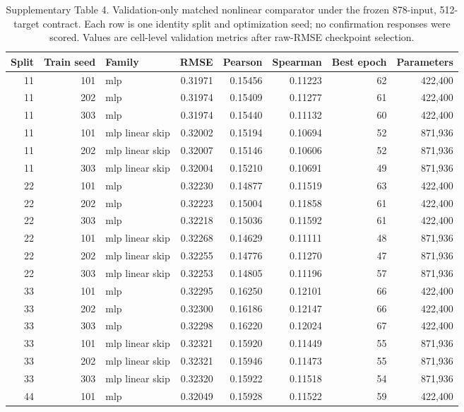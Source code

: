 \begin{table}[ht]\centering\scriptsize\caption{Supplementary Table 4. Validation-only matched nonlinear comparator under the frozen 878-input, 512-target contract. Each row is one identity split and optimization seed; no confirmation responses were scored. Values are cell-level validation metrics after raw-RMSE checkpoint selection.}\label{tab:matched_nonlinear}\begin{tabular}{rrlrrrrr}\toprule Split & Train seed & Family & RMSE & Pearson & Spearman & Best epoch & Parameters \\ \midrule
11 & 101 & mlp & 0.31971 & 0.15456 & 0.11223 & 62 & 422,400 \\
11 & 202 & mlp & 0.31974 & 0.15409 & 0.11277 & 61 & 422,400 \\
11 & 303 & mlp & 0.31974 & 0.15440 & 0.11132 & 60 & 422,400 \\
11 & 101 & mlp linear skip & 0.32002 & 0.15194 & 0.10694 & 52 & 871,936 \\
11 & 202 & mlp linear skip & 0.32007 & 0.15146 & 0.10606 & 52 & 871,936 \\
11 & 303 & mlp linear skip & 0.32004 & 0.15210 & 0.10691 & 49 & 871,936 \\
22 & 101 & mlp & 0.32230 & 0.14877 & 0.11519 & 63 & 422,400 \\
22 & 202 & mlp & 0.32223 & 0.15004 & 0.11858 & 61 & 422,400 \\
22 & 303 & mlp & 0.32218 & 0.15036 & 0.11592 & 61 & 422,400 \\
22 & 101 & mlp linear skip & 0.32268 & 0.14629 & 0.11111 & 48 & 871,936 \\
22 & 202 & mlp linear skip & 0.32255 & 0.14776 & 0.11270 & 47 & 871,936 \\
22 & 303 & mlp linear skip & 0.32253 & 0.14805 & 0.11196 & 57 & 871,936 \\
33 & 101 & mlp & 0.32295 & 0.16250 & 0.12101 & 66 & 422,400 \\
33 & 202 & mlp & 0.32300 & 0.16186 & 0.12147 & 66 & 422,400 \\
33 & 303 & mlp & 0.32298 & 0.16220 & 0.12024 & 67 & 422,400 \\
33 & 101 & mlp linear skip & 0.32321 & 0.15920 & 0.11449 & 55 & 871,936 \\
33 & 202 & mlp linear skip & 0.32321 & 0.15946 & 0.11473 & 55 & 871,936 \\
33 & 303 & mlp linear skip & 0.32320 & 0.15922 & 0.11518 & 54 & 871,936 \\
44 & 101 & mlp & 0.32049 & 0.15928 & 0.11522 & 59 & 422,400 \\

\end{tabular}
\end{table}
